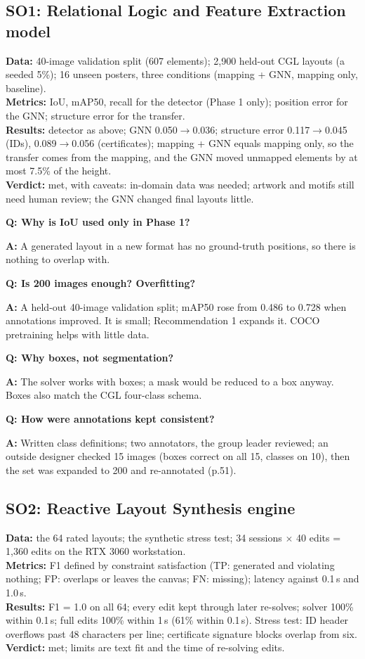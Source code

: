 \documentclass[10pt,a4paper]{article}
\newcommand{\Q}[1]{\par\smallskip\textbf{\color{navy}Q: #1}\par}
\newcommand{\A}{\textbf{A:} }
\begin{document}
\subsection{SO1: Relational Logic and Feature Extraction model}
\textbf{Data:} 40-image validation split (607 elements); 2,900 held-out CGL layouts (a seeded 5\%); 16 unseen posters, three conditions (mapping + GNN, mapping only, baseline).\\
\textbf{Metrics:} IoU, mAP50, recall for the detector (Phase 1 only); position error for the GNN; structure error for the transfer.\\
\textbf{Results:} detector as above; GNN 0.050$\to$0.036; structure error 0.117$\to$0.045 (IDs), 0.089$\to$0.056 (certificates); mapping + GNN equals mapping only, so the transfer comes from the mapping, and the GNN moved unmapped elements by at most 7.5\% of the height.\\
\textbf{Verdict:} met, with caveats: in-domain data was needed; artwork and motifs still need human review; the GNN changed final layouts little.

\Q{Why is IoU used only in Phase 1?}
\A A generated layout in a new format has no ground-truth positions, so there is nothing to overlap with.
\Q{Is 200 images enough? Overfitting?}
\A A held-out 40-image validation split; mAP50 rose from 0.486 to 0.728 when annotations improved. It is small; Recommendation 1 expands it. COCO pretraining helps with little data.
\Q{Why boxes, not segmentation?}
\A The solver works with boxes; a mask would be reduced to a box anyway. Boxes also match the CGL four-class schema.
\Q{How were annotations kept consistent?}
\A Written class definitions; two annotators, the group leader reviewed; an outside designer checked 15 images (boxes correct on all 15, classes on 10), then the set was expanded to 200 and re-annotated (p.51).

\subsection{SO2: Reactive Layout Synthesis engine}
\textbf{Data:} the 64 rated layouts; the synthetic stress test; 34 sessions $\times$ 40 edits = 1,360 edits on the RTX 3060 workstation.\\
\textbf{Metrics:} F1 defined by constraint satisfaction (TP: generated and violating nothing; FP: overlaps or leaves the canvas; FN: missing); latency against 0.1\,s and 1.0\,s.\\
\textbf{Results:} F1 = 1.0 on all 64; every edit kept through later re-solves; solver 100\% within 0.1\,s; full edits 100\% within 1\,s (61\% within 0.1\,s). Stress test: ID header overflows past 48 characters per line; certificate signature blocks overlap from six.\\
\textbf{Verdict:} met; limits are text fit and the time of re-solving edits.
\end{document}
